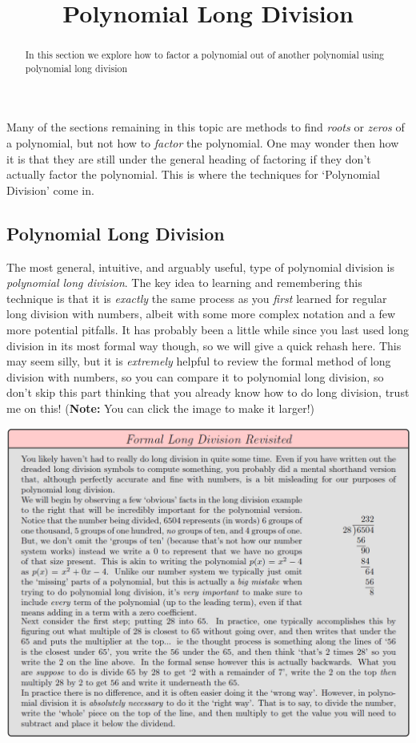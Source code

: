 \documentclass{ximera}
\title{Polynomial Long Division}
\begin{document}
\begin{abstract}
    In this section we explore how to factor a polynomial out of another polynomial using polynomial long division
\end{abstract}
\maketitle

Many of the sections remaining in this topic are methods to find \textit{roots} or \textit{zeros} of a polynomial, but not how to \textit{factor} the polynomial. One may wonder then how it is that they are still under the general heading of factoring if they don't actually factor the polynomial. This is where the techniques for `Polynomial Division' come in.


\subsection{Polynomial Long Division}
    The most general, intuitive, and arguably useful, type of polynomial division is \textit{polynomial long division}. The key idea to learning and remembering this technique is that it is \textit{exactly} the same process as you \textit{first} learned for regular long division with numbers, albeit with some more complex notation and a few more potential pitfalls. It has probably been a little while since you last used long division in its most formal way though, so we will give a quick rehash here. This may seem silly, but it is \textit{extremely} helpful to review the formal method of long division with numbers, so you can compare it to polynomial long division, so don't skip this part thinking that you already know how to do long division, trust me on this! \iftikzexport(\textbf{Note:} You can click the image to make it larger!)\fi
    
    \begin{image}
        \includegraphics[width=\textwidth]{formalLongDivisionRevisited.png}
    \end{image}%
    
\end{document}
